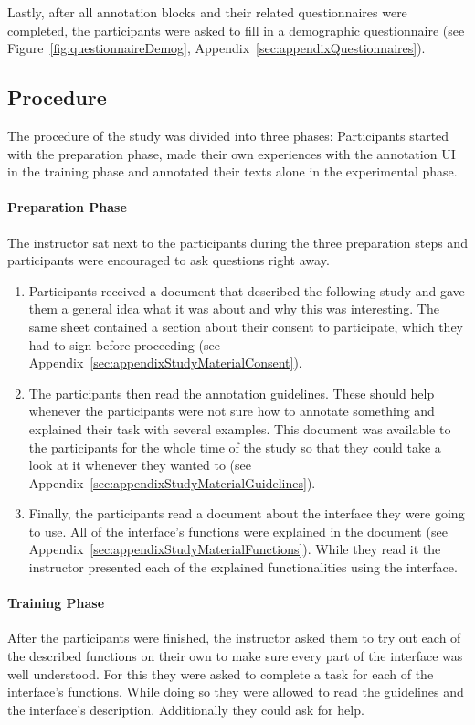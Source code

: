 			Lastly, after all annotation blocks and their related questionnaires were completed, the participants were asked to fill in a demographic questionnaire (see Figure~\ref{fig:questionnaireDemog}, Appendix~\ref{sec:appendixQuestionnaires}).

	\subsection{Procedure}

		The procedure of the study was divided into three phases: Participants started with the preparation phase, made their own experiences with the annotation \ac{UI} in the training phase and annotated their texts alone in the experimental phase.

		\paragraph{Preparation Phase}
			The instructor sat next to the participants during the three preparation steps and participants were encouraged to ask questions right away.

			\begin{enumerate}
				\item Participants received a document that described the following study and gave them a general idea what it was about and why this was interesting. The same sheet contained a section about their consent to participate, which they had to sign before proceeding (see Appendix~\ref{sec:appendixStudyMaterialConsent}).
				\item The participants then read the annotation guidelines. These should help whenever the participants were not sure how to annotate something and explained their task with several examples. This document was available to the participants for the whole time of the study so that they could take a look at it whenever they wanted to (see Appendix~\ref{sec:appendixStudyMaterialGuidelines}).
				\item Finally, the participants read a document about the interface they were going to use. All of the interface's functions were explained in the document (see Appendix~\ref{sec:appendixStudyMaterialFunctions}). While they read it the instructor presented each of the explained functionalities using the interface.
			\end{enumerate}

		\paragraph{Training Phase}
			After the participants were finished, the instructor asked them to try out each of the described functions on their own to make sure every part of the interface was well understood. For this they were asked to complete a task for each of the interface's functions. While doing so they were allowed to read the guidelines and the interface's description. Additionally they could ask for help.

